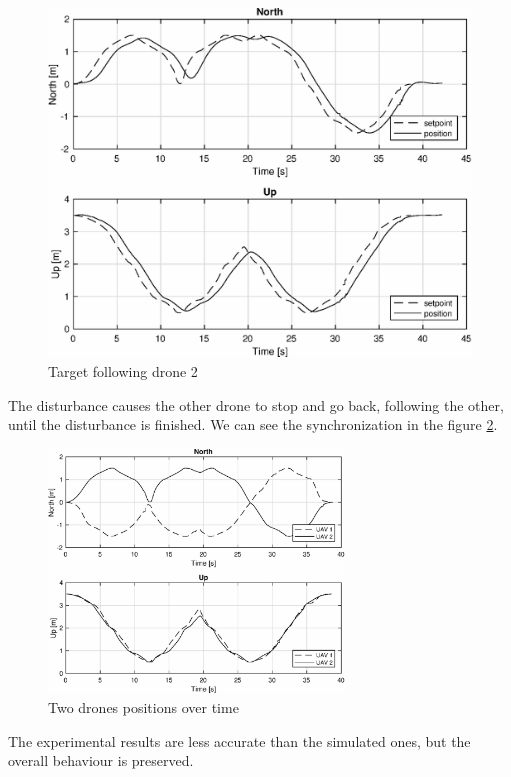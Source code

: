 \begin{figure}
\centering
\includegraphics[width=0.7\linewidth]{chapters/chapter-05/figures/following_2_2.eps}
\caption{Target following drone 2}
\label{fig:exp_following_2_2}
\end{figure}

The disturbance causes the other drone to stop and go back, following the other,
until the disturbance is finished.
We can see the synchronization in the figure \ref{fig:exp_overlapped_2}.

\begin{figure}
\centering
\includegraphics[width=0.7\textwidth]{chapters/chapter-05/figures/overlapped_2.eps}
\caption{Two drones positions over time}
\label{fig:exp_overlapped_2}
\end{figure}

The experimental results are less accurate than the simulated ones,
but the overall behaviour is preserved.
